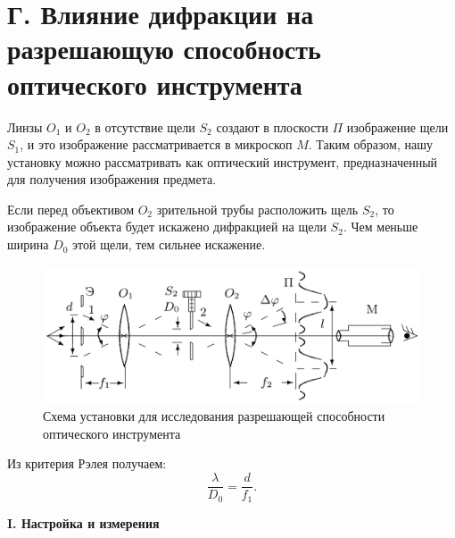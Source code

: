 \documentclass[a4paper,12pt]{article} %
\begin{document}
	\section*{Г. Влияние дифракции на разрешающую способность оптического инструмента}
	
	Линзы $O_1$ и $O_2$ в отсутствие щели $S_2$ создают в плоскости $\Pi$ изображение щели $S_1$, и это изображение рассматривается в микроскоп $M$. Таким образом, нашу установку можно рассматривать как оптический инструмент, предназначенный для получения изображения предмета.
	
	Если перед объективом $O_2$ зрительной трубы расположить щель $S_2$, то изображение объекта будет искажено дифракцией на щели $S_2$. Чем меньше ширина $D_0$ этой щели, тем сильнее искажение.

	\begin{figure}[h!]
		\centering
		\includegraphics[scale=0.5]{Pictures/Rasr}
		\caption{Схема установки для исследования разрешающей способности оптического инструмента}
	\end{figure}

	Из критерия Рэлея получаем:
	\begin{equation*}
		\frac{\lambda}{D_0} = \frac{d}{f_1}.
	\end{equation*}

	
	\begin{center}
		\textbf{I. Настройка и измерения}
	\end{center}
\end{document}
